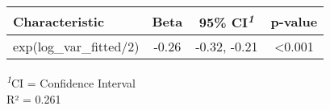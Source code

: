 
\fontsize{12.0pt}{14.4pt}\selectfont
\begin{tabular*}{\linewidth}{@{\extracolsep{\fill}}lccc}
\toprule
\textbf{Characteristic} & \textbf{Beta} & \textbf{95\% CI}\textsuperscript{\textit{1}} & \textbf{p-value} \\ 
\midrule\addlinespace[2.5pt]
exp(log\_var\_fitted/2) & -0.26 & -0.32, -0.21 & <0.001 \\ 
\bottomrule
\end{tabular*}
\begin{minipage}{\linewidth}
\textsuperscript{\textit{1}}CI = Confidence Interval\\
R² = 0.261\\
\end{minipage}


